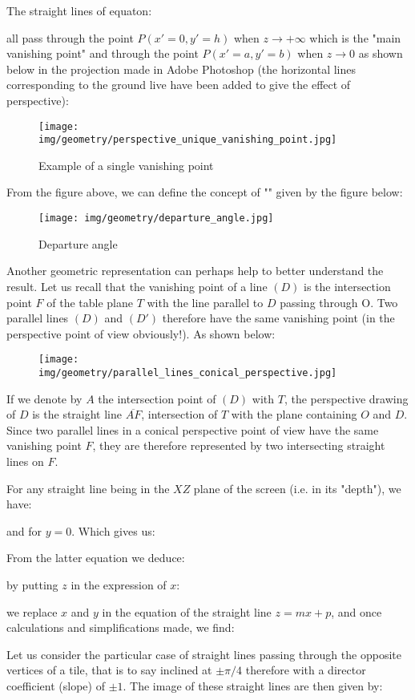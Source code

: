 	The straight lines of equaton:
	
	all pass through the point $P(x'=0,y'=h)$ when $z\rightarrow +\infty$ which is the "main vanishing point" and through the point $P(x'=a,y'=b)$ when $z\rightarrow  0$ as shown below in  the projection made in Adobe Photoshop (the horizontal lines corresponding to the ground live have been added to give the effect of perspective):
	\begin{figure}[H]
		\centering
		\texttt{[image: img/geometry/perspective\_unique\_vanishing\_point.jpg]}
		\caption{Example of a single vanishing point}
	\end{figure}
	From the figure above, we can define the concept of "" given by the figure below:
	\begin{figure}[H]
		\centering
		\texttt{[image: img/geometry/departure\_angle.jpg]}
		\caption{Departure angle}
	\end{figure}
	Another geometric representation can perhaps help to better understand the result. Let us recall that the vanishing point of a line $(D)$ is the intersection point $F$ of the table plane $T$ with the line parallel to $D$ passing through O. Two parallel lines $(D)$ and $(D')$ therefore have the same vanishing point (in the perspective point of view obviously!). As shown below:
	\begin{figure}[H]
		\centering
		\texttt{[image: img/geometry/parallel\_lines\_conical\_perspective.jpg]}
	\end{figure}
	If we denote by $A$ the intersection point of $(D)$ with $T$, the perspective drawing of $D$ is the straight line $\overline{AF}$, intersection of $T$ with the plane containing $O$ and $D$. Since two parallel lines in a conical perspective point of view have the same vanishing point $F$, they are therefore represented by two intersecting straight lines on $F$.
	
	For any straight line being in the $XZ$ plane of the screen (i.e. in its "depth"), we have:
	
	and for $y=0$. Which gives us:
	
	From the latter equation we deduce:
	
	by putting $z$ in the expression of $x$:
	
	we replace $x$ and $y$ in the equation of the straight line $z=mx+p$, and once calculations and simplifications made, we find:
	
	Let us consider the particular case of straight lines passing through the opposite vertices of a tile, that is to say inclined at $\pm\pi/4$ therefore with a director coefficient (slope) of $\pm 1$.
	The image of these straight lines are then given by:
	
